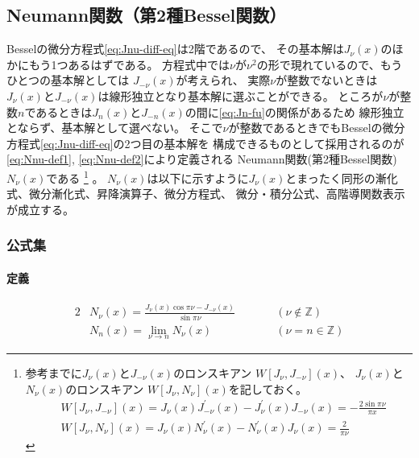 \documentclass[../main/main]{subfiles}
\begin{document}
\subsection{Neumann関数（第2種Bessel関数）}

Besselの微分方程式\eqref{eq:Jnu-diff-eq}は2階であるので、
その基本解は$J_\nu(x)$のほかにもう1つあるはずである。
方程式中では$\nu$が$\nu^2$の形で現れているので、もうひとつの基本解としては
$J_{-\nu}(x)$が考えられ、
実際$\nu$が整数でないときは$J_\nu(x)$と$J_{-\nu}(x)$は線形独立となり基本解に選ぶことができる。
ところが$\nu$が整数$n$であるときは$J_n(x)$と$J_{-n}(x)$の間に\eqref{eq:Jn-fu}の関係があるため
線形独立とならず、基本解として選べない。
そこで$\nu$が整数であるときでもBesselの微分方程式\eqref{eq:Jnu-diff-eq}の2つ目の基本解を
構成できるものとして採用されるのが\eqref{eq:Nnu-def1}, \eqref{eq:Nnu-def2}により定義される
Neumann関数(第2種Bessel関数) $N_\nu(x)$である
\footnote{参考までに$J_\nu(x)$と$J_{-\nu}(x)$のロンスキアン $W[J_\nu, J_{-\nu}] (x)$、
$J_\nu(x)$と$N_\nu(x)$のロンスキアン $W[J_\nu, N_{\nu}] (x)$を記しておく。
\begin{align}
  &W[J_\nu, J_{-\nu}] (x) = J_\nu(x)J_{-\nu}^\prime(x)-J_\nu^\prime(x)J_{-\nu}(x) 
		= -\frac{2\sin\pi\nu}{\pi x} \\
  &W[J_\nu, N_{\nu}] (x) = J_\nu(x)N_{\nu}^\prime(x)-N_\nu^\prime(x)J_{\nu}(x) 
		= \frac{2}{\pi\nu}
\end{align}
}
。
$N_\nu(x)$は以下に示すように$J_\nu(x)$とまったく同形の漸化式、微分漸化式、昇降演算子、微分方程式、
微分・積分公式、高階導関数表示が成立する。



\subsubsection*{公式集}

\vspace{12pt}
\paragraph{定義}
\begin{alignat}{2}
  &N_\nu (x) = \frac{J_\nu (x) \cos\pi\nu - J_{-\nu}(x) }{ \sin\pi\nu} &\qquad & (\nu \notin \mathbb{Z})
	\label{eq:Nnu-def1}\\
  &N_n (x) = \lim_{\nu\to n} N_\nu (x) & & (\nu = n \in \mathbb{Z})
	\label{eq:Nnu-def2}
\end{alignat}
\end{document}
